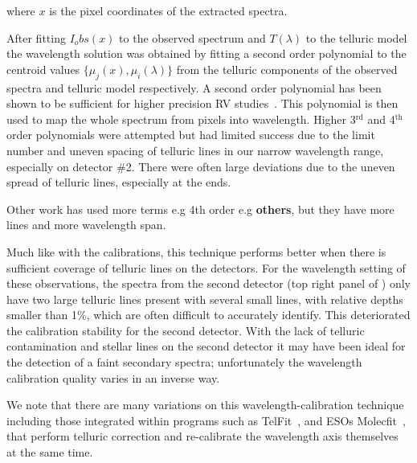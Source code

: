 where \(x \) is the pixel coordinates of the extracted spectra.


After fitting \(I_obs(x)\) to the observed spectrum and \(T(\lambda)\) to the telluric model the wavelength solution was obtained by fitting a second order polynomial to the centroid values \(\{\mu_{j}(x), \mu_{i}(\lambda)\} \) from the telluric components of the observed spectra and telluric model respectively. A second order polynomial has been shown to be sufficient for higher precision RV studies~\citep[e.g.][]{bean_groundbased_2010, figueira_radial_2010}. This polynomial is then used to map the whole spectrum from pixels into wavelength. Higher 3$^{\textrm{rd}}$ and 4$^{\textrm{th}}$ order polynomials were attempted but had limited success due to the limit number and uneven spacing of telluric lines in our narrow wavelength range, especially on detector \#2. There were often large deviations due to the uneven spread of telluric lines, especially at the ends.

Other work has used more terms e.g 4th order e.g \citep{piskorz_evidence_2016a} \textbf{others}, but they have more lines and more wavelength span. 

Much like with the {\thar} calibrations, this technique performs better when there is sufficient coverage of telluric lines on the detectors. For the wavelength setting of these observations, the spectra from the second detector (top right panel of ) only have two large telluric lines present with several small lines, with relative depths smaller than 1\%, which are often difficult to accurately identify. This deteriorated the calibration stability for the second detector. With the lack of telluric contamination and stellar lines on the second detector it may have been ideal for the detection of a faint secondary spectra; unfortunately the wavelength calibration quality varies in an inverse way.


We note that there are many variations on this wavelength-calibration technique including those integrated within programs such as TelFit~\citet{gullikson_correcting_2014}, and ESOs Molecfit~\citet{smette_molecfit_2015}, that perform telluric correction and re-calibrate the wavelength axis themselves at the same time.


